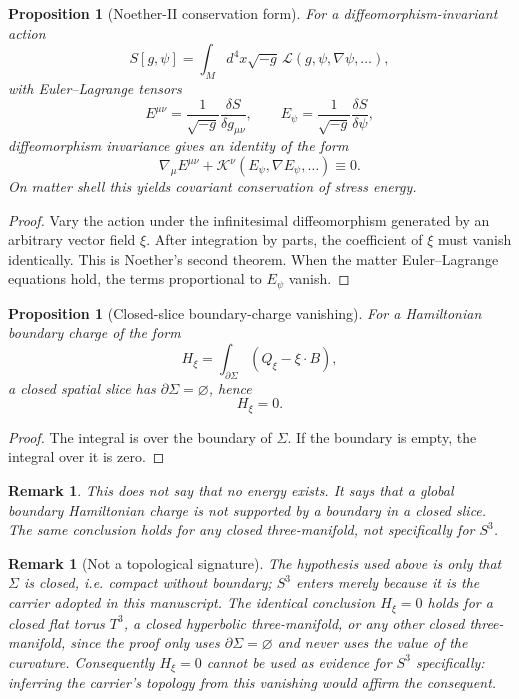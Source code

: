 \documentclass[11pt,a4paper]{article}
\newtheorem{proposition}[theorem]{Proposition}
\newtheorem{remark}[theorem]{Remark}
\begin{document}
\begin{proposition}[Noether-II conservation form]
For a diffeomorphism-invariant action
\[
S[g,\psi]=\int_M d^4x\sqrt{-g}\,\mathcal L(g,\psi,\nabla\psi,\ldots),
\]
with Euler--Lagrange tensors
\[
E^{\mu\nu}=\frac{1}{\sqrt{-g}}\frac{\delta S}{\delta g_{\mu\nu}},
\qquad
E_\psi=\frac{1}{\sqrt{-g}}\frac{\delta S}{\delta\psi},
\]
diffeomorphism invariance gives an identity of the form
\[
\nabla_\mu E^{\mu\nu}+\mathcal K^\nu(E_\psi,\nabla E_\psi,\ldots)\equiv0.
\]
On matter shell this yields covariant conservation of stress energy.
\end{proposition}
\begin{proof}
Vary the action under the infinitesimal diffeomorphism generated by an arbitrary vector field $\xi$.  After integration by parts, the coefficient of $\xi$ must vanish identically.  This is Noether's second theorem.  When the matter Euler--Lagrange equations hold, the terms proportional to $E_\psi$ vanish.
\end{proof}

\begin{proposition}[Closed-slice boundary-charge vanishing]
For a Hamiltonian boundary charge of the form
\[
H_\xi=\int_{\partial\Sigma}(Q_\xi-\xi\cdot B),
\]
a closed spatial slice has $\partial\Sigma=\varnothing$, hence
\[
H_\xi=0.
\]
\end{proposition}
\begin{proof}
The integral is over the boundary of $\Sigma$.  If the boundary is empty, the integral over it is zero.
\end{proof}

\begin{remark}
This does not say that no energy exists.  It says that a global boundary Hamiltonian charge is not supported by a boundary in a closed slice.  The same conclusion holds for any closed three-manifold, not specifically for $S^3$.
\end{remark}


\begin{remark}[Not a topological signature]
The hypothesis used above is only that $\Sigma$ is closed, i.e. compact without boundary; $S^3$ enters merely because it is the carrier adopted in this manuscript.  The identical conclusion $H_\xi=0$ holds for a closed flat torus $T^3$, a closed hyperbolic three-manifold, or any other closed three-manifold, since the proof only uses $\partial\Sigma=\varnothing$ and never uses the value of the curvature.  Consequently $H_\xi=0$ cannot be used as evidence for $S^3$ specifically: inferring the carrier's topology from this vanishing would affirm the consequent.
\end{remark}
\end{document}
